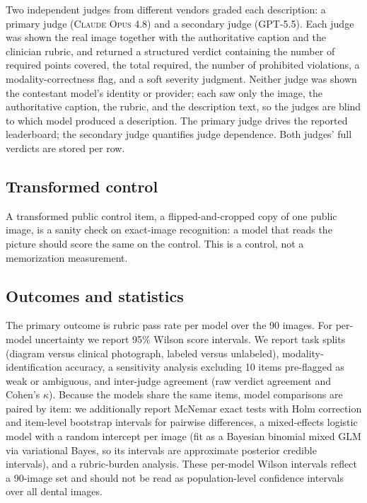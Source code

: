 \documentclass[11pt]{article}
\newcommand{\model}[1]{\textsc{#1}}
\begin{document}
Two independent judges from different vendors graded each description: a primary judge (\model{Claude Opus 4.8}) and a secondary judge (\model{GPT-5.5}). Each judge was shown the real image together with the authoritative caption and the clinician rubric, and returned a structured verdict containing the number of required points covered, the total required, the number of prohibited violations, a modality-correctness flag, and a soft severity judgment. Neither judge was shown the contestant model's identity or provider; each saw only the image, the authoritative caption, the rubric, and the description text, so the judges are blind to which model produced a description. The primary judge drives the reported leaderboard; the secondary judge quantifies judge dependence. Both judges' full verdicts are stored per row.

\subsection{Transformed control}

A transformed public control item, a flipped-and-cropped copy of one public image, is a sanity check on exact-image recognition: a model that reads the picture should score the same on the control. This is a control, not a memorization measurement.

\subsection{Outcomes and statistics}

The primary outcome is rubric pass rate per model over the 90 images. For per-model uncertainty we report 95\% Wilson score intervals. We report task splits (diagram versus clinical photograph, labeled versus unlabeled), modality-identification accuracy, a sensitivity analysis excluding 10 items pre-flagged as weak or ambiguous, and inter-judge agreement (raw verdict agreement and Cohen's $\kappa$). Because the models share the same items, model comparisons are paired by item: we additionally report McNemar exact tests with Holm correction and item-level bootstrap intervals for pairwise differences, a mixed-effects logistic model with a random intercept per image (fit as a Bayesian binomial mixed GLM via variational Bayes, so its intervals are approximate posterior credible intervals), and a rubric-burden analysis. These per-model Wilson intervals reflect a 90-image set and should not be read as population-level confidence intervals over all dental images.
\end{document}
